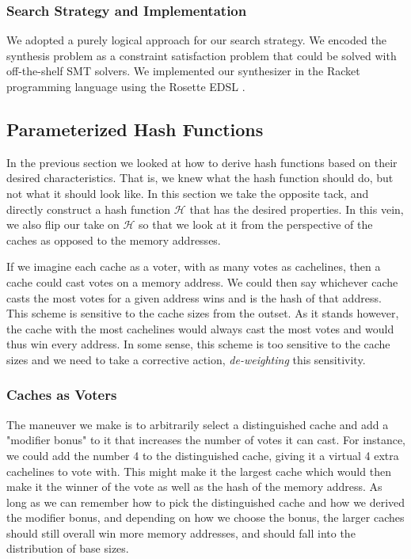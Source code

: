 \subsubsection{Search Strategy and Implementation}

We adopted a purely logical approach for our search strategy. We encoded the
synthesis problem as a constraint satisfaction problem that could be solved with
off-the-shelf SMT solvers. We implemented our synthesizer in the Racket
programming language using the Rosette EDSL \cite{rosette}.


\subsection{Parameterized Hash Functions}

In the previous section we looked at how to derive hash functions based on their
desired characteristics. That is, we knew what the hash function should do, but
not what it should look like. In this section we take the opposite tack, and
directly construct a hash function $\mathcal{H}$ that has the desired
properties. In this vein, we also flip our take on $\mathcal{H}$ so that we look
at it from the perspective of the caches as opposed to the memory addresses.

If we imagine each cache as a voter, with as many votes as cachelines, then a
cache could cast votes on a memory address.  We could then say whichever cache
casts the most votes for a given address wins and is the hash of that
address. This scheme is sensitive to the cache sizes from the outset. As it
stands however, the cache with the most cachelines would always cast the most
votes and would thus win every address.  In some sense, this scheme is too
sensitive to the cache sizes and we need to take a corrective action,
\textit{de-weighting} this sensitivity.

\subsubsection{Caches as Voters}
  
The maneuver we make is to arbitrarily select a distinguished cache and add a
"modifier bonus" to it that increases the number of votes it can cast. For
instance, we could add the number 4 to the distinguished cache, giving it a
virtual 4 extra cachelines to vote with. This might make it the largest cache
which would then make it the winner of the vote as well as the hash of the
memory address.  As long as we can remember how to pick the distinguished cache
and how we derived the modifier bonus, and depending on how we choose the bonus,
the larger caches should still overall win more memory addresses, and should
fall into the distribution of base sizes.

